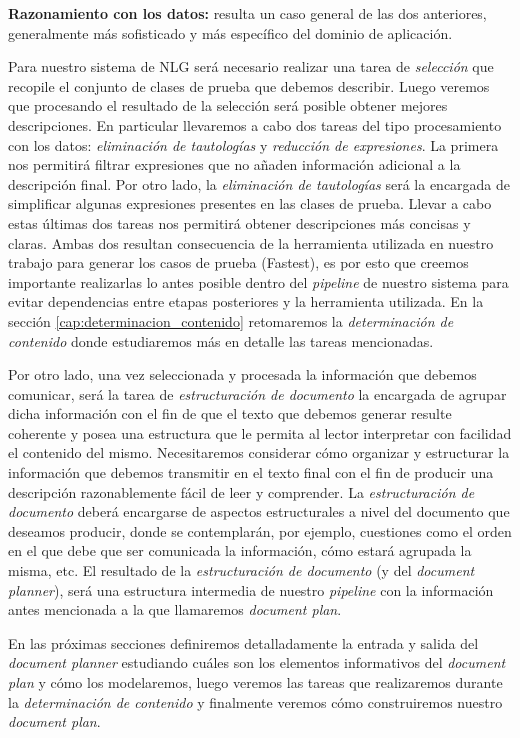 \bigskip
\noindent
\textbf{Razonamiento con los datos:} resulta un caso general de las dos anteriores, generalmente más sofisticado y más específico del dominio de aplicación. 

\bigskip
Para nuestro sistema de NLG será necesario realizar una tarea de \emph{selección} que recopile el conjunto de clases de prueba que debemos describir. Luego veremos que procesando el resultado de la selección será posible obtener mejores descripciones. En particular llevaremos a cabo dos tareas del tipo procesamiento con los datos: \emph{eliminación de tautologías} y \emph{reducción de expresiones}. La primera nos permitirá filtrar expresiones que no añaden información adicional a la descripción final. Por otro lado, la \emph{eliminación de tautologías} será la encargada de simplificar algunas expresiones presentes en las clases de prueba. Llevar a cabo estas últimas dos tareas nos permitirá obtener descripciones más concisas y claras. Ambas dos resultan consecuencia de la herramienta utilizada en nuestro trabajo para generar los casos de prueba (Fastest), es por esto que creemos importante realizarlas lo antes posible dentro del \textit{pipeline} de nuestro sistema para evitar dependencias entre etapas posteriores y la herramienta utilizada. En la sección \ref{cap:determinacion_contenido} retomaremos la \emph{determinación de contenido} donde estudiaremos más en detalle las tareas mencionadas.

Por otro lado, una vez seleccionada y procesada la información que debemos comunicar, será la tarea de \emph{estructuración de documento} la encargada de agrupar dicha información con el fin de que el texto que debemos generar resulte coherente y posea una estructura que le permita al lector interpretar con facilidad el contenido del mismo. Necesitaremos considerar cómo organizar y estructurar la información que debemos transmitir en el texto final con el fin de producir una descripción razonablemente fácil de leer y comprender. La \emph{estructuración de documento} deberá encargarse de aspectos estructurales a nivel del documento que deseamos producir, donde se contemplarán, por ejemplo, cuestiones como el orden en el que debe que ser comunicada la información, cómo estará agrupada la misma, etc. El resultado de la \emph{estructuración de documento} (y del \textit{document planner}), será una estructura intermedia de nuestro \textit{pipeline} con la información antes mencionada a la que llamaremos \emph{document plan}. 

En las próximas secciones definiremos detalladamente la entrada y salida del \textit{document planner} estudiando cuáles son los elementos informativos del \emph{document plan} y cómo los modelaremos, luego veremos las tareas que realizaremos durante la \emph{determinación de contenido} y finalmente veremos cómo construiremos nuestro \textit{document plan}. 

